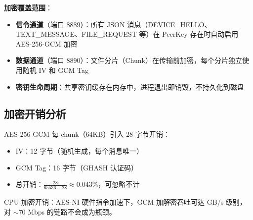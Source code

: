 \documentclass[12pt]{article}
\begin{document}
\textbf{加密覆盖范围}：
\begin{itemize}
    \item \textbf{信令通道}（端口 8889）：所有 JSON 消息（DEVICE\_HELLO、TEXT\_MESSAGE、FILE\_REQUEST 等）在 PeerKey 存在时自动启用 AES-256-GCM 加密
    \item \textbf{数据通道}（端口 8890）：文件分片（Chunk）在传输前加密，每个分片独立使用随机 IV 和 GCM Tag
    \item \textbf{密钥生命周期}：共享密钥缓存在内存中，进程退出即销毁，不持久化到磁盘
\end{itemize}

\subsection{加密开销分析}

AES-256-GCM 每 chunk（64KB）引入 28 字节开销：

\begin{itemize}
    \item IV：12 字节（随机生成，每个消息唯一）
    \item GCM Tag：16 字节（GHASH 认证码）
    \item 总开销：$\frac{28}{65536 + 28} \approx 0.043\%$，可忽略不计
\end{itemize}

CPU 加密开销：AES-NI 硬件指令加速下，GCM 加解密吞吐可达 GB/s 级别，对 $\sim$70 Mbps 的链路不会成为瓶颈。




\end{document}
